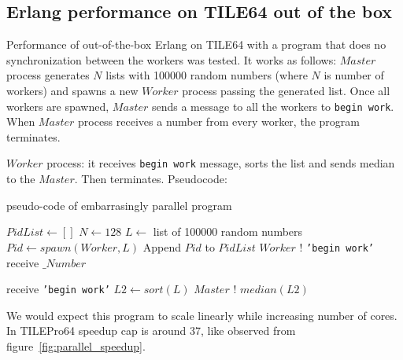 \documentclass[english,11pt]{l4proj}
\begin{document}
\subsection{Erlang performance on TILE64 out of the box}

Performance of out-of-the-box Erlang on TILE64 with a program that does no
synchronization between the workers was tested. It works as follows: $Master$
process generates $N$ lists with 100000 random numbers (where $N$ is number of
workers) and spawns a new $Worker$ process passing the generated list. Once all
workers are spawned, $Master$ sends a message to all the workers to {\tt begin
work}. When $Master$ process receives a number from every worker, the program
terminates.

$Worker$ process: it receives {\tt begin work} message, sorts the list and
sends median to the $Master$. Then terminates. Pseudocode:

\begin{algorithm}
    \caption{pseudo-code of embarrasingly parallel program}
    \begin{algorithmic}
            \State $PidList \gets []$
            \State $N \gets 128$
                \State $L \gets$ list of 100000 random numbers
            \EndFor
            \State $Pid \gets spawn(Worker, L)$
            \State Append $Pid$ to $PidList$
                \State $Worker$ ! {\tt 'begin work'}
            \EndFor
                \State receive $\_Number$
            \EndFor
        \EndFunction

            \State receive {\tt 'begin work'}
            \State $L2 \gets sort(L)$
            \State $Master$ ! $median(L2)$
        \EndFunction
    \end{algorithmic}
\end{algorithm}

We would expect this program to scale linearly while increasing number of cores.
In TILEPro64 speedup cap is around 37, like observed from
figure~\ref{fig:parallel_speedup}.
\end{document}
